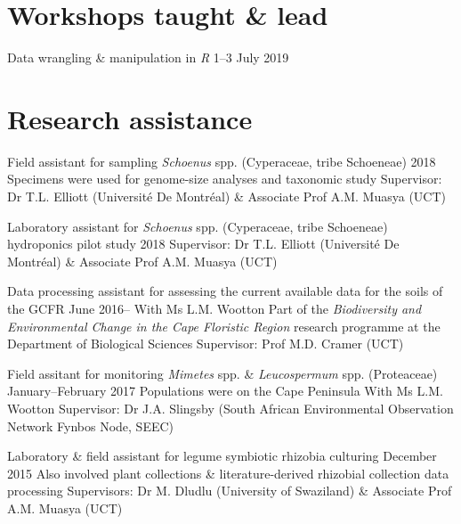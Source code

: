 \documentclass[10pt]{article}
\begin{document}
\section*{Workshops taught \& lead} %

Data wrangling \& manipulation in \textit{R}      \hfill {\small 1--3 July 2019}

\section*{Research assistance} %

\begin{hangparas}{2em}{1}

Field assistant for sampling \textit{Schoenus} spp. (Cyperaceae, tribe 
Schoeneae)                                           \hfill {\small 2018} \break
Specimens were used for genome-size analyses and taxonomic study \break
Supervisor: Dr T.L. Elliott (Université De Montréal) \& Associate Prof A.M. 
Muasya (UCT)

Laboratory assistant for \textit{Schoenus} spp. (Cyperaceae, tribe Schoeneae) 
hydroponics pilot study                              \hfill {\small 2018} \break
Supervisor: Dr T.L. Elliott (Université De Montréal) \& Associate Prof A.M. 
Muasya (UCT)

Data processing assistant for assessing the current available data for the 
soils of the GCFR                             \hfill {\small June 2016--} \break
With Ms L.M. Wootton \break
Part of the \textit{Biodiversity and Environmental Change in the Cape Floristic 
Region} research programme at the Department of Biological Sciences \break
Supervisor: Prof M.D. Cramer (UCT)

Field assitant for monitoring \textit{Mimetes} spp. \& \textit{Leucospermum} 
spp. (Proteaceae)                  \hfill {\small January--February 2017} \break
Populations were on the Cape Peninsula \break
With Ms L.M. Wootton \break
Supervisor: Dr J.A. Slingsby (South African Environmental Observation Network 
Fynbos Node, SEEC)

Laboratory \& field assistant for legume symbiotic rhizobia culturing
                                            \hfill {\small December 2015} \break
Also involved plant collections \& literature-derived rhizobial collection 
data processing \break
Supervisors: Dr M. Dludlu (University of Swaziland) \& Associate Prof A.M. 
Muasya (UCT)


\hfill

\end{hangparas}
\end{document}
